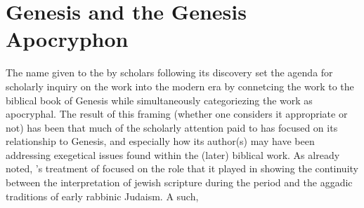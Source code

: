 \section{Genesis and the Genesis Apocryphon}

The name given to the \ga by scholars following its discovery set the agenda for scholarly inquiry on the work into the modern era by connetcing the work to the biblical book of Genesis while simultaneously categoriezing the work as apocryphal. The result of this framing (whether one considers it appropriate or not) has been that much of the scholarly attention paid to \ga has focused on its relationship to Genesis, and especially how its author(s) may have been addressing exegetical issues found within the (later) biblical work. As already noted, \vermes's treatment of \ga focused on the role that it played in showing the continuity between the interpretation of jewish scripture during the \secondtemple period and the aggadic traditions of early rabbinic Judaism. A such, 